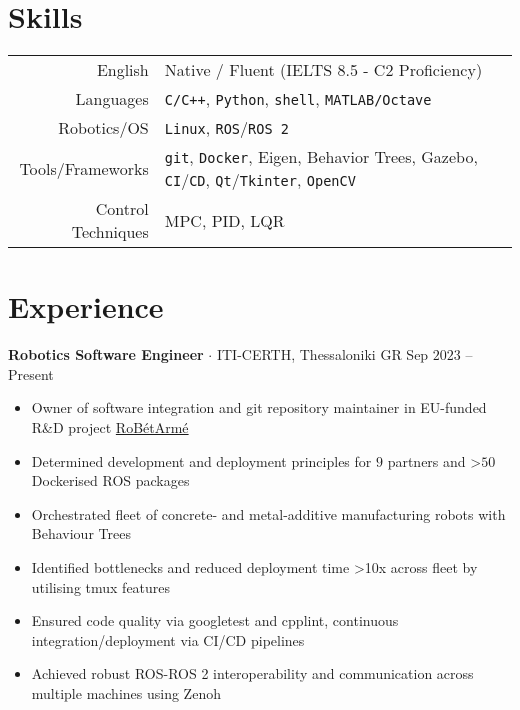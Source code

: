 \documentclass[a4paper,10pt,twoside]{article}
\begin{document}
\section{\textbf{Skills}}\verticalspacebetweensectionandcontent

\begin{center}
\begin{tabular}{rl}
English & Native / Fluent (IELTS 8.5 - C2 Proficiency) \\
Languages & \texttt{C/C++}, \texttt{Python}, \texttt{shell}, \texttt{MATLAB/Octave} \\
Robotics/OS & \texttt{Linux},  \texttt{ROS}/\texttt{ROS 2} \\
Tools/Frameworks & \texttt{git}, \texttt{Docker}, Eigen, Behavior Trees, Gazebo, \texttt{CI}/\texttt{CD}, \texttt{Qt}/\texttt{Tkinter}, \texttt{OpenCV} \\
Control Techniques & MPC, PID, LQR
\end{tabular}
\end{center}
\verticalspacebetweensections

\section{\textbf{Experience}}\verticalspacebetweensectionandcontent

  \noindent\textbf{Robotics Software Engineer} $\cdot$ ITI-CERTH, Thessaloniki GR \hfill {\small \textcolor{agray}{Sep $2023$ -- Present}} \\
  \begin{minipage}[t]{\textwidth}
    \begin{itemize}
      \item Owner of software integration and git repository maintainer in EU-funded R\&D project \href{https://www.robetarme-project.eu/sobre/}{RoBétArmé}\verticalspaceafteritem
      \item Determined development and deployment principles for $9$ partners and >$50$ Dockerised ROS packages\verticalspaceafteritem
      \item Orchestrated fleet of concrete- and metal-additive manufacturing robots with Behaviour Trees\verticalspaceafteritem
      \item Identified bottlenecks and reduced deployment time >10x across fleet by utilising tmux features \verticalspaceafteritem
      \item Ensured code quality via googletest and cpplint, continuous integration/deployment via CI/CD pipelines\verticalspaceafteritem
      \item Achieved robust ROS-ROS 2 interoperability and communication across multiple machines using Zenoh
    \end{itemize}
  \end{minipage} \\[0.2em]
\end{document}
